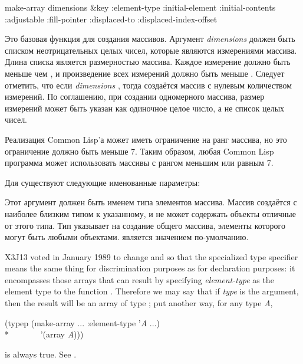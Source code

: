 \begin{defun}[Функция]
make-array dimensions &key :element-type :initial-element :initial-contents :adjustable :fill-pointer :displaced-to :displaced-index-offset

Это базовая функция для создания массивов. Аргумент \emph{dimensions} должен
быть списком неотрицательных целых чисел, которые являются измерениями массива. Длина
списка является размерностью массива. Каждое измерение должно быть меньше чем
, и произведение всех измерений должно быть меньше
.
Следует отметить, что если \emph{dimensions} {\nil}, тогда создаётся массив с
нулевым количеством измерений.
По соглашению, при создании одномерного массива, размер измерений может
быть указан как одиночное целое число, а не список целых чисел.

Реализация Common Lisp'а может иметь ограничение на ранг массива, но это
ограничение должно быть меньше 7. Таким образом, любая Common
Lisp программа может использовать массивы с рангом меньшим или равным 7.

Для  существуют следующие именованные параметры:

\begin{flushdesc}

\item[\cd{:element-type}]
Этот аргумент должен быть именем типа элементов массива.
Массив создаётся с наиболее близким типом к указанному, и не может содержать
объекты отличные от этого типа.
Тип {\true} указывает на создание общего массива, элементы которого могут быть
любыми объектами. {\true} является значением по-умолчанию.

\begin{new}
X3J13 voted in January 1989
to change  and 
so that the specialized  type specifier
means the same thing for discrimination purposes
as for declaration purposes: it encompasses those arrays
that can result by specifying \emph{element-type} as the element type
to the function .  Therefore we may say
that if \emph{type} is the  argument, then
the result will be an array of type ;
put another way, for any type \emph{A},
\begin{lisp}
(typep (make-array ... :element-type '\emph{A} ...) \\*
~~~~~~~'(array \emph{A\/})))
\end{lisp}
is always true.
See .
\end{new}


\end{flushdesc}
\end{defun}
